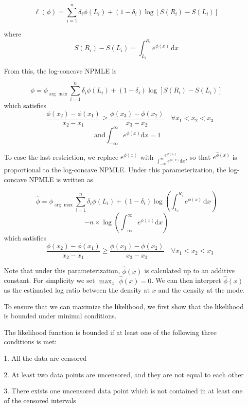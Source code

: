 	\[\ell(\phi) = \displaystyle \sum_{i = 1}^n \delta_i \phi(L_i)   + (1 - \delta_i) \log \left[ S(R_i) - S(L_i) \right]
	\]
	
	where 
	\[
	S(R_i)  - S(L_i) = \int_{L_i}^{R_i} e^ { \phi(x) } \,\mathrm{d}x  
	\]
	
	From this, the log-concave NPMLE is 
	
	\[ \hat \phi ={\phi}_{\arg \max}  \displaystyle \sum_{i = 1}^n \delta_i \phi(L_i)   + (1 - \delta_i) \log \left[ S(R_i) - S(L_i) \right] 
	\]
	which satisfies 
	\[
	 \quad \frac{ \phi(x_2) - \phi(x_1)} {x_2 - x_1} \geq \frac{ \phi(x_3) - \phi(x_2)} {x_3 - x_2} \quad \forall x_1 < x_2 < x_3 
	 \]
	 \[ 
	 \textrm{ and} \int_{-\infty}^{\infty} e^{\phi (x) } \mathrm{d}x = 1
	\]

	To ease the last restriction, we replace $e^{\phi(x)}$ with $\frac{e^{\phi(x)} } { \int_{-\infty}^{\infty}  e^{\phi(x)} \mathrm{d}x}$, so that $e^{\hat \phi(x)}$ is proportional to the log-concave NPMLE. Under this parameterization, the log-concave NPMLE is written as 

	\[ \hat \phi ={\phi}_{\arg \max} \displaystyle \sum_{i = 1}^n \delta_i \phi(L_i)   + (1 - \delta_i) \log \left( \int_{L_i}^{R_i} e^ { \phi(x) } \,\mathrm{d}x \right) \]
	\[
	- n \times \log \left(  \int_{-\infty}^{\infty} e^ { \phi(x) } \mathrm{d}x \right) 
	\]
	which satisfies
	\[
	 \quad \frac{ \phi(x_2) - \phi(x_1)} {x_2 - x_1} \geq \frac{ \phi(x_3) - \phi(x_2)} {x_3 - x_2}\quad \forall x_1 < x_2 < x_3 
	 \]
	
	Note that under this parameterization, $\hat \phi(x)$ is calculated up to an additive constant. For simplicity we set $\max_x $ $\hat \phi(x) = 0$. We can then interpret $\hat \phi(x)$ as the estimated log ratio between the density at $x$ and the density at the mode.

	To ensure that we can maximize the likelihood, we first show that the likelihood is bounded under minimal conditions.	
	
	\begin{thm}
	\label{thm1}
	The likelihood function is bounded if at least one of the following three conditions is met:
	
	1. All the data are censored
	
	2. At least two data points are uncensored, and they are not equal to each other
	
	3. There exists one uncensored data point which is not contained in at least one of the censored intervals
	
	
	\end{thm}
	
